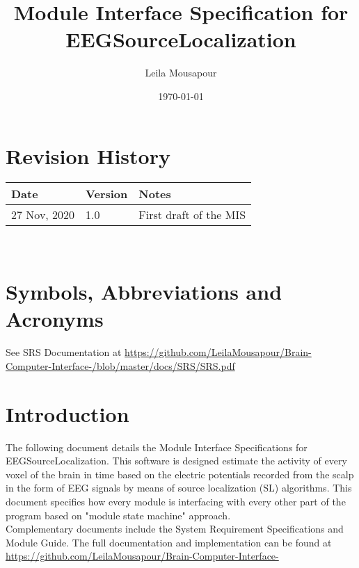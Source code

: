\documentclass[12pt, titlepage]{article}
\renewcommand{\progname}{EEGSourceLocalization}
\begin{document}
\title{Module Interface Specification for \progname{}}

\author{Leila Mousapour}

\date{\today}

\maketitle


\section{Revision History}

\begin{tabularx}{\textwidth}{p{3cm}p{2cm}X}
\toprule {\bf Date} & {\bf Version} & {\bf Notes}\\
\midrule
27 Nov, 2020 & 1.0 & First draft of the MIS\\

\bottomrule
\end{tabularx}

~\newpage

\section{Symbols, Abbreviations and Acronyms}

See SRS Documentation at \url{https://github.com/LeilaMousapour/Brain-Computer-Interface-/blob/master/docs/SRS/SRS.pdf}

\newpage

\tableofcontents

\newpage


\section{Introduction}

The following document details the Module Interface Specifications for
\progname{}. This software is designed estimate the activity of every voxel of the brain in time based on the electric potentials recorded from the scalp in the form of EEG signals by means of source localization (SL) algorithms. This document specifies how every module is interfacing with every other part of the program based on  "module state machine" approach.\\

Complementary documents include the System Requirement Specifications
and Module Guide.  The full documentation and implementation can be
found at \url{https://github.com/LeilaMousapour/Brain-Computer-Interface-}
\end{document}
